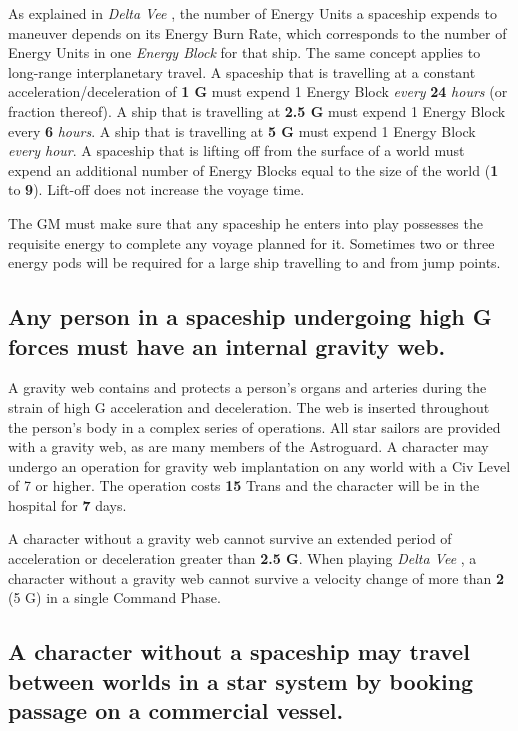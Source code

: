 As explained in \emph{Delta Vee} , the number of Energy Units a spaceship
expends to maneuver depends on its Energy Burn Rate, which corresponds
to the number of Energy Units in one \emph{Energy Block} for that
ship. The same concept applies to long-range interplanetary travel. A
spaceship that is travelling at a constant acceleration/deceleration
of \textbf{1 G} must expend 1 Energy Block \emph{every} \textbf{24}
\emph{hours} (or fraction thereof). A ship that is travelling at
\textbf{2.5 G} must expend 1 Energy Block every \textbf{6}
\emph{hours}. A ship that is travelling at \textbf{5 G} must expend 1
Energy Block \emph{every hour}. A spaceship that is lifting off from
the surface of a world must expend an additional number of Energy
Blocks equal to the size of the world (\textbf{1} to \textbf{9}).
Lift-off does not increase the voyage time.

The GM must make sure that any spaceship he enters into play possesses
the requisite energy to complete any voyage planned for it.  Sometimes
two or three energy pods will be required for a large ship travelling
to and from jump points.

\subsection[Internal Gravity Web]{Any person in a spaceship undergoing
  high G forces must 
  have an \hypertarget{tag:gravity-web}{internal gravity web}.}
\label{sec:gravity-web}



A gravity web contains and protects a person's organs and arteries
during the strain of high G acceleration and deceleration. The web is
inserted throughout the person's body in a complex series of
operations.  All star sailors are provided with a gravity web, as are
many members of the Astroguard. A character may undergo an operation
for gravity web implantation on any world with a Civ Level of 7 or
higher. The operation costs \textbf{15} Trans and the character will
be in the hospital for \textbf{7} days.

A character without a gravity web cannot survive an extended period of
acceleration or deceleration greater than \textbf{2.5 G}.  When
playing \emph{Delta Vee} , a character without a gravity web cannot survive a
velocity change of more than \textbf{2} (5 G) in a single Command
Phase.

\subsection[Commercial Interplanetary Travel]{A character without a
  spaceship may travel between worlds in a star system by booking
  passage on a  
commercial vessel.}
\label{sec:commercial-interplanetary-travel}


